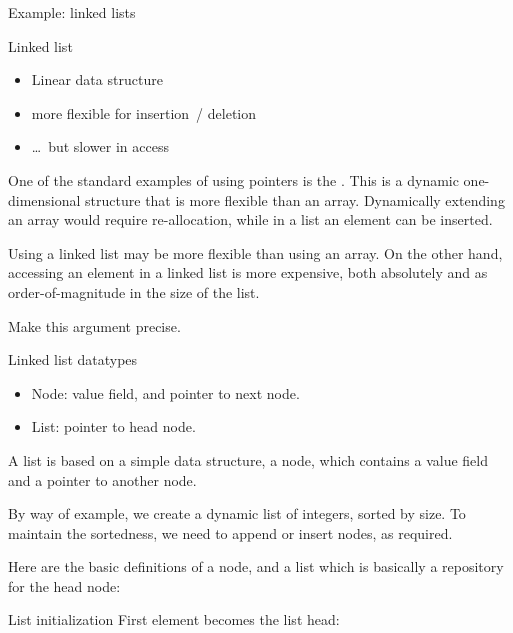 
 {Example: linked lists}

\begin{block}{Linked list}
  \begin{itemize}
  \item Linear data structure
  \item more flexible for insertion~/ deletion
  \item \ldots~but slower in access
  \end{itemize}
\end{block}

One of the standard examples of using pointers is the
. This is a dynamic one-dimensional structure
that is more flexible than an array. Dynamically extending an array
would require re-allocation, while in a list an element can be
inserted.

\begin{exercise}
  Using a linked list may be more flexible than using an array.
  On the other hand, accessing an element in a linked list is
  more expensive, both absolutely and as order-of-magnitude in the size
  of the list.

  Make this argument precise.
\end{exercise}

\begin{block}{Linked list datatypes}
  \begin{itemize}
  \item Node: value field, and pointer to next node.
  \item List: pointer to head node.
  \end{itemize}
\end{block}

A list is based on a simple data structure, a node, which contains a
value field and a pointer to another node.

By way of example, we create a dynamic list of integers, sorted by
size. To maintain the sortedness, we need to append or insert nodes,
as required.

Here are the basic definitions of a node, and a list which is
basically a repository for the head node:
%

\begin{block}{List initialization}
  First element becomes the list head:

  
\end{block}


